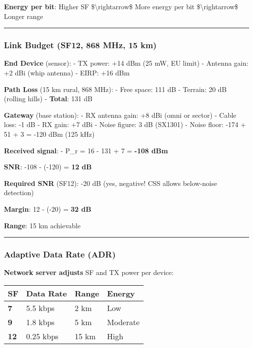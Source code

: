 \textbf{Energy per bit}: Higher SF \$\textbackslash rightarrow\$ More
energy per bit \$\textbackslash rightarrow\$ Longer range

\begin{center}\rule{0.5\linewidth}{0.5pt}\end{center}

\subsubsection{Link Budget (SF12, 868 MHz, 15
km)}\label{link-budget-sf12-868-mhz-15-km}

\textbf{End Device} (sensor): - TX power: +14 dBm (25 mW, EU limit) -
Antenna gain: +2 dBi (whip antenna) - EIRP: +16 dBm

\textbf{Path Loss} (15 km rural, 868 MHz): - Free space: 111 dB -
Terrain: 20 dB (rolling hills) - \textbf{Total}: 131 dB

\textbf{Gateway} (base station): - RX antenna gain: +8 dBi (omni or
sector) - Cable loss: -1 dB - RX gain: +7 dBi - Noise figure: 3 dB
(SX1301) - Noise floor: -174 + 51 + 3 = -120 dBm (125 kHz)

\textbf{Received signal}: - P\_r = 16 - 131 + 7 = \textbf{-108 dBm}

\textbf{SNR}: -108 - (-120) = \textbf{12 dB}

\textbf{Required SNR} (SF12): -20 dB (yes, negative! CSS allows
below-noise detection)

\textbf{Margin}: 12 - (-20) = \textbf{32 dB}

\textbf{Range}: 15 km achievable

\begin{center}\rule{0.5\linewidth}{0.5pt}\end{center}

\subsubsection{Adaptive Data Rate (ADR)}\label{adaptive-data-rate-adr}

\textbf{Network server adjusts} SF and TX power per device:

{\def\LTcaptype{} %
\begin{longtable}[]{@{}llll@{}}
\toprule\noalign{}
SF & Data Rate & Range & Energy \\
\midrule\noalign{}
\endhead
\bottomrule\noalign{}
\endlastfoot
\textbf{7} & 5.5 kbps & 2 km & Low \\
\textbf{9} & 1.8 kbps & 5 km & Moderate \\
\textbf{12} & 0.25 kbps & 15 km & High \\
\end{longtable}
}


